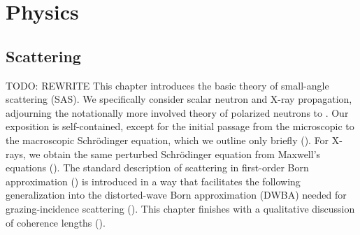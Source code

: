 
\def\Do{\overset{o}{D}}
\def\Go{\overset{o}{G}}
\def\TD{\TENS{D}}
\def\Td{\TENS{\delta}}
\def\TG{\TENS{G}}
\def\TU{\TENS{U}}
\def\TV{\TENS{V}}
\def\TL{\TENS{\Lambda}}
\def\TDo{\TENS{\overset{o}{D}}}
\def\TGo{\TENS{\overset{o}{G}}}
\def\vGo{\v{\overset{o}{G}}\vphantom{\v{G}}}
\def\Psio{\v{\overset{o}{\Psi}}\vphantom{\Psi}}
\def\ue{\v{\hat u}}

\def\pfo{\overset{o}{\psi}_\sf}
\def\pfoc{\overset{o}{\psi}\vphantom{\psi}^*_\sf}

%
%

\part{Physics}\label{PPHYS}

\chapter{Scattering}  \label{SSca}

TODO: REWRITE
This chapter introduces the basic theory of small-angle scattering (SAS).
%
%
We specifically consider scalar neutron and X-ray propagation,
adjourning the notationally more involved
theory of polarized neutrons to .
Our exposition is self-contained,
except for the initial passage from the microscopic
to the macroscopic Schrödinger equation,
which we outline only briefly ().
For X-rays, we obtain the same perturbed Schrödinger equation from Maxwell's equations
().
The standard description of scattering in first-order Born approximation
()
is introduced in a way that facilitates the following generalization
into the distorted-wave Born approximation (DWBA)
needed for grazing-incidence scattering ().
This chapter finishes with a qualitative discussion
of coherence lengths ().

